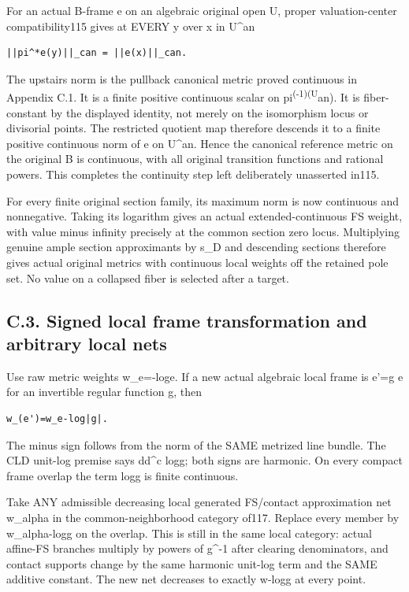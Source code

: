 \documentclass[
  10pt,
]{article}
\begin{document}
For an actual B-frame e on an algebraic original open U, proper
valuation-center compatibility115 gives at EVERY y over x in U\^{}an

\begin{verbatim}
||pi^*e(y)||_can = ||e(x)||_can.
\end{verbatim}

The upstairs norm is the pullback canonical metric proved continuous in
Appendix C.1. It is a finite positive continuous scalar on
pi\textsuperscript{(-1)(U}an). It is fiber-constant by the displayed
identity, not merely on the isomorphism locus or divisorial points. The
restricted quotient map therefore descends it to a finite positive
continuous norm of e on U\^{}an. Hence the canonical reference metric on
the original B is continuous, with all original transition functions and
rational powers. This completes the continuity step left deliberately
unasserted in115.

For every finite original section family, its maximum norm is now
continuous and nonnegative. Taking its logarithm gives an actual
extended-continuous FS weight, with value minus infinity precisely at
the common section zero locus. Multiplying genuine ample section
approximants by s\_D and descending sections therefore gives actual
original metrics with continuous local weights off the retained pole
set. No value on a collapsed fiber is selected after a target.

\subsection{C.3. Signed local frame transformation and arbitrary local
nets}\label{c.3.-signed-local-frame-transformation-and-arbitrary-local-nets}

Use raw metric weights w\_e=-log\textbar\textbar e\textbar\textbar. If a
new actual algebraic local frame is e'=g e for an invertible regular
function g, then

\begin{verbatim}
w_(e')=w_e-log|g|.
\end{verbatim}

The minus sign follows from the norm of the SAME metrized line bundle.
The CLD unit-log premise says dd\^{}c log\textbar g; both
signs are harmonic. On every compact frame overlap the term
log\textbar g\textbar{} is finite continuous.

Take ANY admissible decreasing local generated FS/contact approximation
net w\_alpha in the common-neighborhood category of117. Replace every
member by w\_alpha-log\textbar g\textbar{} on the overlap. This is still
in the same local category: actual affine-FS branches multiply by powers
of g\^{}-1 after clearing denominators, and contact supports change by
the same harmonic unit-log term and the SAME additive constant. The new
net decreases to exactly w-log\textbar g\textbar{} at every point.
\end{document}

